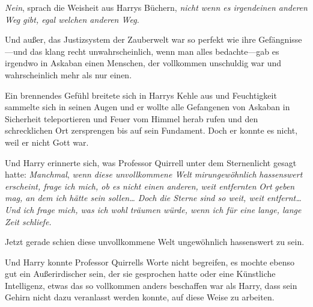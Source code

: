 \emph{Nein}, sprach die Weisheit aus Harrys Büchern, \emph{nicht wenn es irgendeinen anderen Weg gibt, egal welchen anderen Weg.}

Und außer, das Justizsystem der Zauberwelt war so perfekt wie ihre Gefängnisse—und das klang recht unwahrscheinlich, wenn man alles bedachte—gab es irgendwo in Askaban einen Menschen, der vollkommen unschuldig war und wahrscheinlich mehr als nur einen.

Ein brennendes Gefühl breitete sich in Harrys Kehle aus und Feuchtigkeit sammelte sich in seinen Augen und er wollte alle Gefangenen von Askaban in Sicherheit teleportieren und Feuer vom Himmel herab rufen und den schrecklichen Ort zersprengen bis auf sein Fundament. Doch er konnte es nicht, weil er nicht Gott war.

Und Harry erinnerte sich, was Professor Quirrell unter dem Sternenlicht gesagt hatte: \emph{Manchmal}, \emph{wenn diese unvollkommene Welt} \emph{mirungewöhnlich} \emph{hassenswert erscheint, frage ich mich, ob es nicht einen anderen,} \emph{weit entfernten} \emph{Ort} \emph{geben mag, an dem ich hätte sein sollen… Doch die Sterne sind so weit, weit entfernt… Und ich frage mich, was ich wohl träumen würde, wenn ich für eine lange, lange Zeit schliefe.}

Jetzt gerade schien diese unvollkommene Welt ungewöhnlich hassenswert zu sein.

Und Harry konnte Professor Quirrells Worte nicht begreifen, es mochte ebenso gut ein Außerirdischer sein, der sie gesprochen hatte oder eine Künstliche Intelligenz, etwas das so vollkommen anders beschaffen war als Harry, dass sein Gehirn nicht dazu veranlasst werden konnte, auf diese Weise zu arbeiten.


